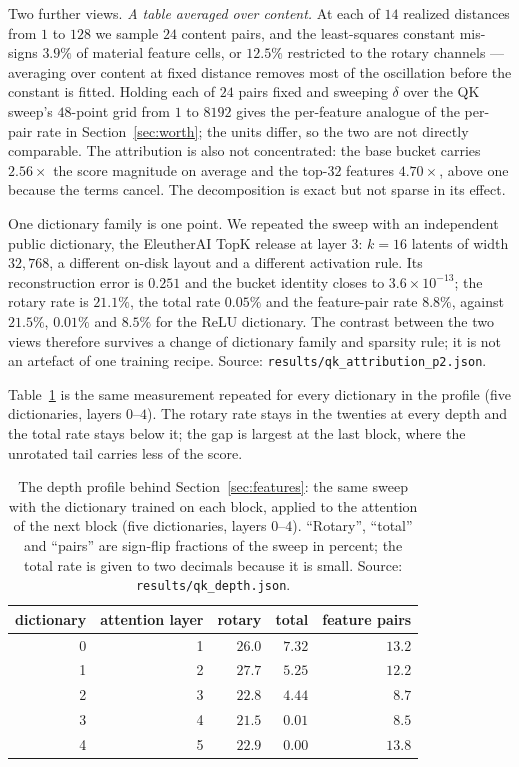 \documentclass{article}
\theoremstyle{plain}
\theoremstyle{remark}
\begin{document}
Two further views. \emph{A table averaged over content.} At each of $14$
realized distances from $1$ to $128$ we sample $24$ content pairs, and the
least-squares constant mis-signs $3.9\%$ of material feature cells, or $12.5\%$
restricted to the rotary channels --- averaging over content at fixed distance
removes most of the oscillation before the constant is fitted. Holding each of
$24$ pairs fixed and sweeping $\delta$ over the QK sweep's $48$-point grid from $1$
to $8192$ gives the per-feature analogue of the per-pair rate in
Section~\ref{sec:worth}; the units differ, so the two are not directly
comparable. The attribution
is also not concentrated: the base bucket carries $2.56\times$ the score
magnitude on average and the top-$32$ features $4.70\times$, above one because
the terms cancel. The decomposition is exact but not sparse in its effect.

One dictionary family is one point. We repeated the sweep with an independent
public dictionary, the EleutherAI TopK release at layer $3$: $k=16$ latents of
width $32{,}768$, a different on-disk layout and a different activation rule.
Its reconstruction error is $0.251$ and the bucket identity closes to
$3.6\times10^{-13}$; the rotary rate is $21.1\%$, the total rate $0.05\%$ and the
feature-pair rate $8.8\%$, against $21.5\%$, $0.01\%$ and $8.5\%$ for the ReLU
dictionary. The contrast between the two views therefore survives a change of
dictionary family and sparsity rule; it is not an artefact of one training
recipe. Source: \texttt{results/qk\_attribution\_p2.json}.

Table~\ref{tab:qk-depth} is the same measurement repeated for every dictionary in
the profile (five dictionaries, layers $0$--$4$). The rotary rate stays in the
twenties at every depth and
the total rate stays below it; the gap is largest at the last block, where the
unrotated tail carries less of the score.

\begin{table}[t]
  \centering
  \caption{The depth profile behind Section~\ref{sec:features}: the same sweep
    with the dictionary trained on each block, applied to the attention of the
    next block (five dictionaries, layers $0$--$4$). ``Rotary'', ``total'' and
    ``pairs'' are sign-flip fractions of the sweep in percent; the total rate is
    given to two decimals because it is small. Source:
    \texttt{results/qk\_depth.json}.}
  \label{tab:qk-depth}
  \begin{tabular}{rrrrr}
    \toprule
    dictionary & attention layer & rotary & total & feature pairs \\
    \midrule
    0 & 1 & $26.0$ & $7.32$ & $13.2$ \\
    1 & 2 & $27.7$ & $5.25$ & $12.2$ \\
    2 & 3 & $22.8$ & $4.44$ & $8.7$ \\
    3 & 4 & $21.5$ & $0.01$ & $8.5$ \\
    4 & 5 & $22.9$ & $0.00$ & $13.8$ \\
    \bottomrule
  \end{tabular}
\end{table}
\end{document}
